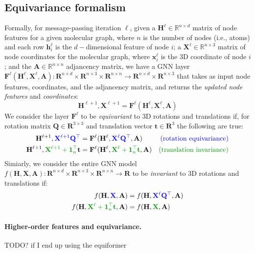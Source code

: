 \subsection{Equivariance formalism}
Formally, for message-passing iteration $\ell$, given a $\mathbf{H}^{\ell}\in\mathbb{R}^{n \times d}$ matrix of node features for a given molecular graph, where $n$ is the number of nodes (i.e., atoms) and each row $\mathbf{h}^{\ell}_i$ is the $d-$dimensional feature of node $i$; a $\textbf{X}^{\ell}\in \mathbb{R}^{n \times 3}$ matrix of node coordinates for the molecular graph, where $\mathbf{x}^{\ell}_i$ is the 3D coordinate of node $i$; and the $\mathbf{A}\in\mathbb{R}^{n \times n}$ adjancency matrix, 
we have a GNN layer $\mathbf{F}^{\ell}(\mathbf{H}^{\ell}, \mathbf{X}^{\ell}, \mathbf{A}):\mathbf{R}^{n \times d}\times \mathbf{R}^{n \times 3} \times \mathbf{R}^{n \times n} \rightarrow \mathbf{R}^{n \times d} \times \mathbf{R}^{n \times 3}$ that takes as input node features, coordinates, and the adjancency matrix, and returns the \textit{updated node features} and \textit{coordinates}:
\begin{equation}
    \mathbf{H}^{\ell +1},\mathbf{X}^{\ell + 1} = \mathbf{F}^{\ell}(\mathbf{H}^{\ell}, \mathbf{X}^{\ell}, \mathbf{A})
\end{equation} 
We consider the layer $\mathbf{F}^{\ell}$ to be \textit{equivariant} to 3D rotations and translations if, for rotation matrix $\mathbf{Q}\in \mathbf{R}^{3 \times 3}$ and translation vector $\mathbf{t}\in \mathbf{R}^3$ the following are true:
\begin{align}
    \mathbf{H}^{\ell + 1}, {\color{blue}\mathbf{X}^{\ell + 1}\mathbf{Q}^{\top}} &= \mathbf{F}^{\ell}(\mathbf{H}^{\ell}, {\color{blue}\mathbf{X}^{\ell}\mathbf{Q}^{\top}}, \mathbf{A}) &\text{{\color{blue}(rotation equivariance)}} \\
    \mathbf{H}^{\ell + 1}, {\color{green!60!black}\mathbf{X}^{\ell + 1} + \mathbf{1}_n^{\top}}\mathbf{t} &= \mathbf{F}^{\ell}(\mathbf{H}^{\ell}, {\color{green!60!black}\mathbf{X}^{\ell} + \mathbf{1}_n^{\top}\mathbf{t}}, \mathbf{A}) &\text{{\color{green!60!black}(translation invariance)}}
\end{align}
Simiarly, we consider the entire GNN model $f(\mathbf{H}, \mathbf{X}, \mathbf{A}):\mathbf{R}^{n\times d}\times\mathbf{R}^{n\times 3}\times \mathbf{R}^{n \times n} \rightarrow \mathbf{R}$ to be \textit{invariant} to 3D rotations and translations if:
\begin{align}
    f(\mathbf{H}, {\color{blue}\mathbf{X}}, \mathbf{A}) &= f(\mathbf{H}, {\color{blue}\mathbf{X}^{\ell}\mathbf{Q}^{\top}}, \mathbf{A}) \\
    f(\mathbf{H},  {\color{green!60!black}\mathbf{X}^{\ell} + \mathbf{1}_n^{\top}\mathbf{t}}, \mathbf{A}) &= f(\mathbf{H}, {\color{green!60!black}\mathbf{X}}, \mathbf{A})
\end{align}

\paragraph{Higher-order features and equivariance.}
{\color{red} TODO? if I end up using the equiformer}


